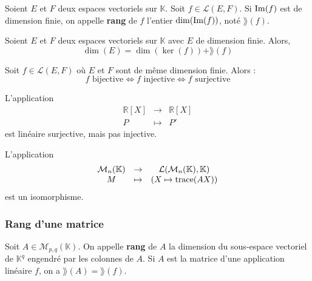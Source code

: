 
	\begin{definition}
		Soient $E$ et $F$ deux espaces vectoriels sur $\mathbb{K}$. Soit $f \in \mathcal{L}(E, F)$. Si $\mathrm{Im}(f)$ est de dimension finie, on appelle \textbf{rang} de $f$ l'entier $\dim(\mathrm{Im}(f))$, noté $\rang (f)$.
	\end{definition}

	\begin{theorem}
		Soient $E$ et $F$ deux espaces vectoriels sur $\mathbb{K}$ avec $E$ de dimension finie. Alors,
		\[ \dim(E) = \dim(\ker (f)) + \rang (f) \]
	\end{theorem}

	\begin{corollary}
		Soit $f \in \mathcal{L}(E, F)$ où $E$ et $F$ sont de même dimension finie. Alors :
		\[ f \text{ bijective} \iff f \text{ injective} \iff f \text{ surjective} \]
	\end{corollary}

	\begin{cexample}
		L'application
		\[
		\begin{array}{ccc}
			\mathbb{R}[X] &\rightarrow& \mathbb{R}[X] \\
			P &\mapsto& P'
		\end{array}
		\]
		est linéaire surjective, mais pas injective.
	\end{cexample}


	\begin{application}
		L'application
		\[
		\begin{array}{ccc}
			\mathcal{M}_n(\mathbb{K}) &\rightarrow& \mathcal{L}(\mathcal{M}_n(\mathbb{K}), \mathbb{K}) \\
			M &\mapsto& (X \mapsto \operatorname{trace}(AX))
		\end{array}
		\]
		est un isomorphisme.
	\end{application}

	\subsubsection{Rang d'une matrice}


	\begin{definition}
		Soit $A \in \mathcal{M}_{p,q}(\mathbb{K})$. On appelle \textbf{rang} de $A$ la dimension du sous-espace vectoriel de $\mathbb{K}^q$ engendré par les colonnes de $A$. Si $A$ est la matrice d'une application linéaire $f$, on a $\rang (A) = \rang (f)$.
	\end{definition}

